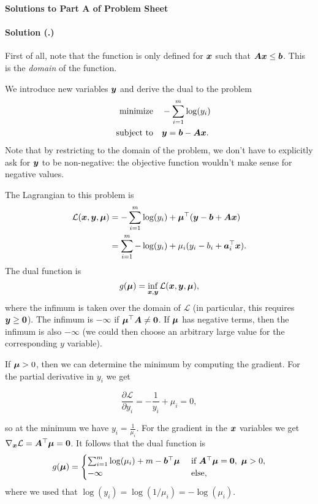 \documentclass{article}
\newcounter{problemSheetNumber}
\newcounter{problems}
\renewcommand{\solution}[1]{\paragraph{Solution (\theproblemSheetNumber.\theproblems)}\addtocounter{problems}{1}\label{#1}}
\begin{document}
 
\begin{center}
{\Large {\bf Solutions to Part A of Problem Sheet \theproblemSheetNumber}}
\end{center}

\solution{pr:1} First of all, note that the function is only defined for $\bm{x}$ such that $\bm{A}\bm{x}\leq \bm{b}$. This is the {\em domain} of the function. 

We introduce new variables $\bm{y}$ and derive the dual to the problem
\begin{align*}
 \text{minimize}\quad & -\sum_{i=1}^m \log(y_i)\\
 \quad\text{subject to}\quad & \bm{y}=\bm{b}-\bm{A}\bm{x}.
\end{align*}
Note that by restricting to the domain of the problem, we don't have to explicitly ask for $\bm{y}$ to be non-negative: the objective function wouldn't make sense for negative values.

The Lagrangian to this problem is
\begin{align*}
 \mathcal{L}(\bm{x},\bm{y},\bm{\mu}) &= -\sum_{i=1}^m \log(y_i)+\bm{\mu}^{\top}(\bm{y}-\bm{b}+\bm{A}\bm{x})\\
 &= \sum_{i=1}^m -\log(y_i)+\mu_i(y_i-b_i+\bm{a}_i^{\top}\bm{x}).
\end{align*}
The dual function is
\begin{equation*}
 g(\bm{\mu}) = \inf_{\bm{x},\bm{y}} \mathcal{L}(\bm{x},\bm{y},\bm{\mu}),
\end{equation*}
where the infimum is taken over the domain of $\mathcal{L}$ (in particular, this requires $\bm{y}\geq \bm{0}$). 
The infimum is $-\infty$ if $\bm{\mu}^{\top}\bm{A}\neq \bm{0}$. If $\bm{\mu}$ has negative terms, then the infimum is also $-\infty$ (we could then choose an arbitrary large value for the corresponding $y$ variable). 

If $\bm{\mu}>0$, then we can determine the minimum by computing the gradient. For the partial derivative in $y_i$ we get

\begin{equation*}
  \frac{\partial \mathcal{L}}{\partial y_i} = -\frac{1}{y_i}+\mu_i = 0,
\end{equation*}

so at the minimum we have $y_i=\frac{1}{\mu_i}$. For the gradient in the $\bm{x}$ variables we get $\nabla_{\bm{x}}\mathcal{L} = \bm{A}^{\top}\bm{\mu}=\bm{0}$. 
It follows that the dual function is
\begin{equation*}
 g(\vct{\mu}) = \begin{cases}
                   \sum_{i=1}^m \log(\mu_i)+m-\vct{b}^{\trans}\vct{\mu} & \text{ if } \mtx{A}^{\trans}\vct{\mu}=\zerovct, \ \vct{\mu}>0,\\
                   -\infty & \text{ else,}
                \end{cases}
\end{equation*}
where we used that $\log(y_i) = \log(1/\mu_i) = -\log(\mu_i)$. 
\end{document}

